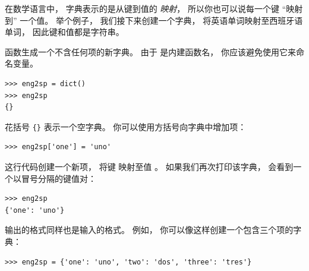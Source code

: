 在数学语言中， 字典表示的是从键到值的 {\em 映射}， 所以你也可以说每一个键 ``映射到'' 一个值。    举个例子， 我们接下来创建一个字典， 将英语单词映射至西班牙语单词， 因此键和值都是字符串。


 函数生成一个不含任何项的新字典。   由于  是内建函数名， 你应该避免使用它来命名变量。

  

\begin{lstlisting}
>>> eng2sp = dict()
>>> eng2sp
{}
\end{lstlisting}


花括号 \verb"{}" 表示一个空字典。  你可以使用方括号向字典中增加项：

  

\begin{lstlisting}
>>> eng2sp['one'] = 'uno'
\end{lstlisting}

%

这行代码创建一个新项， 将键  映射至值 。
如果我们再次打印该字典， 会看到一个以冒号分隔的键值对：

\begin{lstlisting}
>>> eng2sp
{'one': 'uno'}
\end{lstlisting}

%

输出的格式同样也是输入的格式。   例如， 你可以像这样创建一个包含三个项的字典：

\begin{lstlisting}
>>> eng2sp = {'one': 'uno', 'two': 'dos', 'three': 'tres'}
\end{lstlisting}

%

